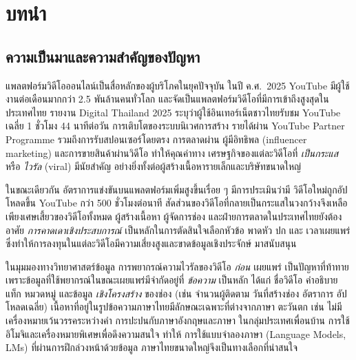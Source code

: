 \chapter{บทนำ}
\label{ch:intro}

\section{ความเป็นมาและความสำคัญของปัญหา}
\label{sec:intro-background}

แพลตฟอร์มวิดีโอออนไลน์เป็นสื่อหลักของผู้บริโภคในยุคปัจจุบัน ในปี ค.ศ.\ 2025
YouTube มีผู้ใช้งานต่อเดือนมากกว่า 2.5 พันล้านคนทั่วโลก \cite{kemp2025digital}
และจัดเป็นแพลตฟอร์มวิดีโอที่มีการเข้าถึงสูงสุดในประเทศไทย รายงาน Digital
Thailand 2025 ระบุว่าผู้ใช้อินเทอร์เน็ตชาวไทยรับชม YouTube เฉลี่ย 1 ชั่วโมง
44 นาทีต่อวัน \cite{datareportal2025thailand} การเติบโตของระบบนิเวศการสร้าง
รายได้ผ่าน YouTube Partner Programme รวมถึงการรับสปอนเซอร์โดยตรง การตลาดผ่าน
ผู้มีอิทธิพล (influencer marketing) และการขายสินค้าผ่านวิดีโอ ทำให้คุณค่าทาง
เศรษฐกิจของแต่ละวิดีโอที่ \emph{เป็นกระแส} หรือ \emph{ไวรัล} (viral) มีนัยสำคัญ
อย่างยิ่งทั้งต่อผู้สร้างเนื้อหารายเล็กและบริษัทขนาดใหญ่

ในขณะเดียวกัน อัตราการแข่งขันบนแพลตฟอร์มเพิ่มสูงขึ้นเรื่อย ๆ มีการประเมินว่ามี
วิดีโอใหม่ถูกอัปโหลดขึ้น YouTube กว่า 500 ชั่วโมงต่อนาที \cite{ceci2024youtube}
สัดส่วนของวิดีโอที่กลายเป็นกระแสในวงกว้างจึงเหลือเพียงเศษเสี้ยวของวิดีโอทั้งหมด
ผู้สร้างเนื้อหา ผู้จัดการช่อง และฝ่ายการตลาดในประเทศไทยยังต้องอาศัย
\emph{การคาดเดาเชิงประสบการณ์} เป็นหลักในการตัดสินใจเลือกหัวข้อ พาดหัว ปก และ
เวลาเผยแพร่ ซึ่งทำให้การลงทุนในแต่ละวิดีโอมีความเสี่ยงสูงและขาดข้อมูลเชิงประจักษ์
มาสนับสนุน

ในมุมมองทางวิทยาศาสตร์ข้อมูล การพยากรณ์ความไวรัลของวิดีโอ \emph{ก่อน} เผยแพร่
เป็นปัญหาที่ท้าทาย เพราะข้อมูลที่ใช้พยากรณ์ในขณะเผยแพร่มีจำกัดอยู่ที่
\emph{ข้อความ} เป็นหลัก ได้แก่ ชื่อวิดีโอ คำอธิบาย แท็ก หมวดหมู่ และข้อมูล
\emph{เชิงโครงสร้าง} ของช่อง (เช่น จำนวนผู้ติดตาม วันที่สร้างช่อง อัตราการ
อัปโหลดเฉลี่ย) เนื้อหาที่อยู่ในรูปข้อความภาษาไทยมีลักษณะเฉพาะที่ต่างจากภาษา
ตะวันตก เช่น ไม่มีเครื่องหมายเว้นวรรคระหว่างคำ การปะปนกับภาษาอังกฤษและภาษา
ในกลุ่มประเทศเพื่อนบ้าน การใช้อิโมจิและเครื่องหมายพิเศษเพื่อดึงความสนใจ ทำให้
การใช้แบบจำลองภาษา (Language Models, LMs) ที่ผ่านการฝึกล่วงหน้าด้วยข้อมูล
ภาษาไทยขนาดใหญ่จึงเป็นทางเลือกที่น่าสนใจ

